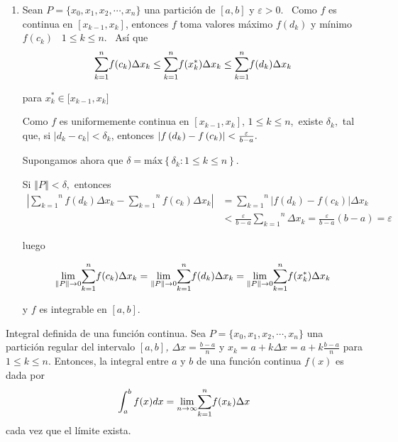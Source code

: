 \begin{enumerate}[leftmargin=1.2em,   itemindent=0pt,       labelwidth=\labelwidth,labelsep=0.5em,]
\item Sean $P=\{x_{0},x_{1},x_{2},\cdots ,x_{n}\}$ una partición de $[a,b]$
y $\varepsilon >0.$ \ Como $f$ es continua en $[x_{k-1},x_{k}]$,
entonces $f$ toma valores máximo $f(d_{k})$ y mínimo
$f(c_{k})$ \ $1\leq k\leq n.$ \ Así que \
{\small
\[
\overset{n}{\underset{k=1}{\sum }}f(c_{k})\Delta x_{k}\leq \overset{n}{%
\underset{k=1}{\sum }}f(x_{k}^{\ast })\Delta x_{k}\leq \overset{n}{%
\underset{k=1}{\sum }}f(d_{k})\Delta x_{k}
\]
}

para $x_{k}^{\ast }\in
\lbrack x_{k-1},x_{k}]$

Como $f$ es uniformemente continua en $[x_{k-1},x_{k}]$, $1\leq
k\leq n$,\ existe $\delta _{k},$ tal que, si $\left\vert
d_{k}-c_{k}\right\vert <\delta _{k}$, entonces $\left\vert
f\left( d_{k}\right) -f\left( c_{k}\right) \right\vert <\frac{\varepsilon }{%
b-a}.$

Supongamos ahora que $\delta =\text{máx}\left\{ \delta _{k}:1\leq
k\leq n\right\}.$

Si $\left\Vert P\right\Vert <\delta ,$ entonces
{\small
\begin{align*}
\left\vert \overset{n}{\underset{k=1}{\sum }}f(d_{k})\Delta x_{k}-%
\overset{n}{\underset{k=1}{\sum }}f(c_{k})\Delta x_{k}\right\vert &=%
\overset{n}{\underset{k=1}{\sum }}\left\vert
f(d_{k})-f(c_{k})\right\vert \Delta x_{k}\\
&<\frac{\varepsilon }{b-a}
\overset{n}{\underset{k=1}{\sum }}\Delta x_{k}%
=\frac{\varepsilon }{b-a}\left( b-a\right) =\varepsilon
\end{align*}
}

luego

{\small
\[
\underset{\left\Vert P\right\Vert \rightarrow 0}{\lim }\overset{n}{\underset%
{k=1}{\sum }}f(c_{k})\Delta x_{k}=\underset{\left\Vert P\right\Vert
\rightarrow 0}{\lim }\overset{n}{\underset{k=1}{\sum }}f(d_{k})\Delta
x_{k}=\underset{\left\Vert P\right\Vert \rightarrow 0}{\lim }\overset{n}{%
\underset{k=1}{\sum }}f(x_{k}^{\ast })\Delta x_{k}
\]
}

y $f$ es integrable en $[a,b].$
\end{enumerate}

\begin{defi}
\textnormal{{Integral definida de una función continua}. Sea \textit{$P=\{x_{0},x_{1},x_{2},\cdots ,x_{n}\}$} una partición regular del
intervalo \textit{$[a,b]$, $\Delta x=\frac{b-a}{n}$} y \textit{$x_{k}=a+k\Delta x=a+k\frac{b-a}{n}$} para \textit{$1\leq k\leq n$}. Entonces, la integral entre \textit{$a$} y \textit{$b$} de
una función continua $f(x)$ es dada por
\[
\int_{a}^{b}f(x)dx=\underset{n\rightarrow \infty }{\lim }\overset{n}{%
\underset{k=1}{\sum }}f(x_{k})\Delta x
\]
 cada vez que el límite exista.}
\end{defi}

